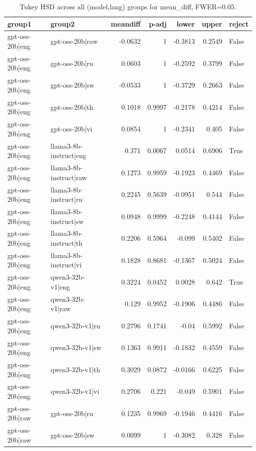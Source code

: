 \begin{table}
\caption{Tukey HSD across all (model,lang) groups for mean_diff, FWER=0.05.}
\label{tab:tukey_all_models_all_langs_mean_diff}
\begin{tabular}{l l r r r r l}
\toprule
group1 & group2 & meandiff & p-adj & lower & upper & reject \\
\midrule
gpt-oss-20b|eng & gpt-oss-20b|raw & -0.0632 & 1 & -0.3813 & 0.2549 & False \\
gpt-oss-20b|eng & gpt-oss-20b|ru & 0.0603 & 1 & -0.2592 & 0.3799 & False \\
gpt-oss-20b|eng & gpt-oss-20b|sw & -0.0533 & 1 & -0.3729 & 0.2663 & False \\
gpt-oss-20b|eng & gpt-oss-20b|th & 0.1018 & 0.9997 & -0.2178 & 0.4214 & False \\
gpt-oss-20b|eng & gpt-oss-20b|vi & 0.0854 & 1 & -0.2341 & 0.405 & False \\
gpt-oss-20b|eng & llama3-8b-instruct|eng & 0.371 & 0.0067 & 0.0514 & 0.6906 & True \\
gpt-oss-20b|eng & llama3-8b-instruct|raw & 0.1273 & 0.9959 & -0.1923 & 0.4469 & False \\
gpt-oss-20b|eng & llama3-8b-instruct|ru & 0.2245 & 0.5639 & -0.0951 & 0.544 & False \\
gpt-oss-20b|eng & llama3-8b-instruct|sw & 0.0948 & 0.9999 & -0.2248 & 0.4144 & False \\
gpt-oss-20b|eng & llama3-8b-instruct|th & 0.2206 & 0.5964 & -0.099 & 0.5402 & False \\
gpt-oss-20b|eng & llama3-8b-instruct|vi & 0.1828 & 0.8681 & -0.1367 & 0.5024 & False \\
gpt-oss-20b|eng & qwen3-32b-v1|eng & 0.3224 & 0.0452 & 0.0028 & 0.642 & True \\
gpt-oss-20b|eng & qwen3-32b-v1|raw & 0.129 & 0.9952 & -0.1906 & 0.4486 & False \\
gpt-oss-20b|eng & qwen3-32b-v1|ru & 0.2796 & 0.1741 & -0.04 & 0.5992 & False \\
gpt-oss-20b|eng & qwen3-32b-v1|sw & 0.1363 & 0.9911 & -0.1832 & 0.4559 & False \\
gpt-oss-20b|eng & qwen3-32b-v1|th & 0.3029 & 0.0872 & -0.0166 & 0.6225 & False \\
gpt-oss-20b|eng & qwen3-32b-v1|vi & 0.2706 & 0.221 & -0.049 & 0.5901 & False \\
gpt-oss-20b|raw & gpt-oss-20b|ru & 0.1235 & 0.9969 & -0.1946 & 0.4416 & False \\
gpt-oss-20b|raw & gpt-oss-20b|sw & 0.0099 & 1 & -0.3082 & 0.328 & False \\

\end{tabular}
\end{table}
